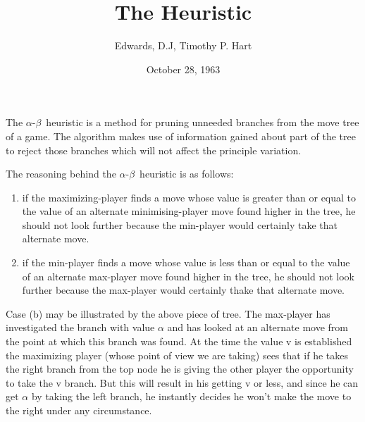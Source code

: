 \documentclass{tufte-handout}
\title{The \alphabeta Heuristic}
\author[Edwards, D.J, Timothy P. Hart]{Edwards, D.J, Timothy P. Hart}
\date{October 28, 1963} %
\newcommand{\alphabeta}[0]{$\alpha$-$\beta$~}
\begin{document}
\maketitle%

The \alphabeta heuristic is a method for pruning unneeded branches from the move
tree of a game. The algorithm makes use of information gained about part of the
tree to reject those branches which will not affect the principle variation.

The reasoning behind the \alphabeta heuristic is as follows:
\begin{enumerate}[label=\alph*)]
\item if the maximizing-player finds a move whose value is greater than or equal
  to the value of an alternate minimising-player move found higher in the tree,
  he should not look further because the min-player would certainly take that
  alternate move.
\item if the min-player finds a move whose value is less than or equal to the
  value of an alternate max-player move found higher in the tree, he should not
  look further because the max-player would certainly thake that alternate move.
\end{enumerate}

\begin{center}
\end{center}

Case (b) may be illustrated by the above piece of tree. The max-player has
investigated the branch with value $\alpha$ and has looked at an alternate move
from the point at which this branch was found. At the time the value v is
established the maximizing player (whose point of view we are taking) sees that
if he takes the right branch from the top node he is giving the other player the
opportunity to take the v branch. But this will result in his getting v or less,
and since he can get $\alpha$ by taking the left branch, he instantly decides he
won't make the move to the right under any circumstance.
\end{document}
